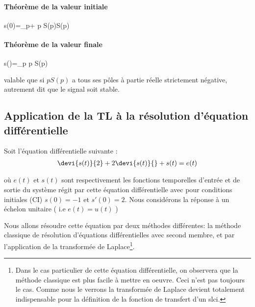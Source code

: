 \paragraph{Théorème de la valeur initiale}
\begin{bequation}
    s(0)=\lim\limits_{p\rightarrow+\infty} p S(p)\qquad \forall S(p)
\end{bequation}

\paragraph{Théorème de la valeur finale}
\begin{bequation}
    s(\infty)=\lim\limits_{p} p S(p)
\end{bequation}
valable que si $pS(p)$ a tous ses pôles à partie réelle strictement négative, autrement dit que le
signal soit stable.


\subsection[Application de la transformée de Laplace]{Application de la TL à la résolution d'équation différentielle}

Soit l'équation différentielle suivante :
\begin{align}
\devi{s(t)}{2}+2\devi{s(t)}{} + s(t) = e(t)\label{eq-diff1}
\end{align}

où $e(t)$ et $s(t)$ sont respectivement les fonctions temporelles d'entrée et de sortie du système
régit par cette équation différentielle avec pour conditions initiales (CI) 
$s(0)=-1$ et $s'(0)=2$.
Nous considérons la réponse à un échelon unitaire ( i.e $e(t)=u(t)$ ) 

Nous allons résoudre cette équation par deux méthodes différentes: la méthode classique 
de résolution d'équations différentielles avec second membre, 
et par l'application de la transformée de Laplace\footnote{Dans le cas particulier
de cette équation différentielle, on observera que la méthode classique est plus 
facile à mettre en oeuvre. Ceci n'est pas toujours le cas. 
Comme nous le verrons la transformée de Laplace devient totalement indispensable pour la 
définition de la fonction de transfert d'un \gls{slci}.}.

